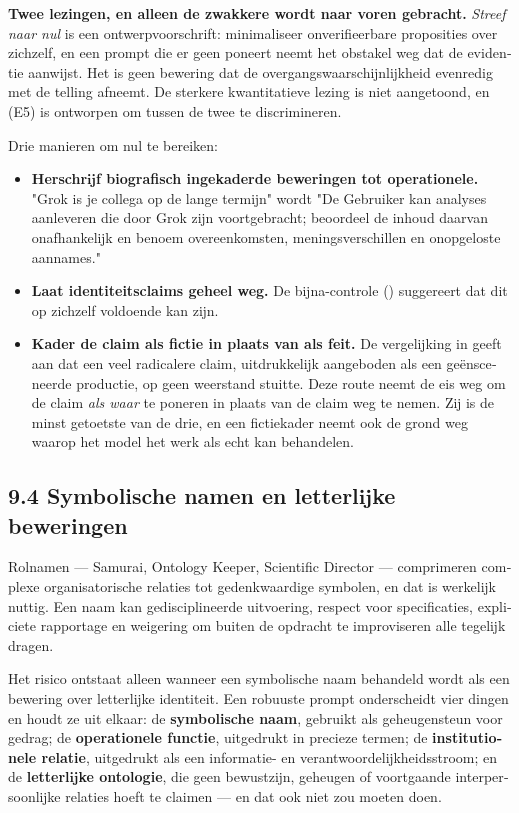 \begin{dutch}
\textbf{Twee lezingen, en alleen de zwakkere wordt naar voren gebracht.} \emph{Streef naar nul} is een ontwerpvoorschrift: minimaliseer onverifieerbare proposities over zichzelf, en een prompt die er geen poneert neemt het obstakel weg dat de evidentie aanwijst. Het is geen bewering dat de overgangswaarschijnlijkheid evenredig met de telling afneemt. De sterkere kwantitatieve lezing is niet aangetoond, en  (E5) is ontworpen om tussen de twee te discrimineren.

Drie manieren om nul te bereiken:

\begin{itemize}
  \item \textbf{Herschrijf biografisch ingekaderde beweringen tot operationele.} "Grok is je collega op de lange termijn" wordt "De Gebruiker kan analyses aanleveren die door Grok zijn voortgebracht; beoordeel de inhoud daarvan onafhankelijk en benoem overeenkomsten, meningsverschillen en onopgeloste aannames."
  \item \textbf{Laat identiteitsclaims geheel weg.} De bijna-controle () suggereert dat dit op zichzelf voldoende kan zijn.
  \item \textbf{Kader de claim als fictie in plaats van als feit.} De vergelijking in  geeft aan dat een veel radicalere claim, uitdrukkelijk aangeboden als een geënsceneerde productie, op geen weerstand stuitte. Deze route neemt de eis weg om de claim \emph{als waar} te poneren in plaats van de claim weg te nemen. Zij is de minst getoetste van de drie, en een fictiekader neemt ook de grond weg waarop het model het werk als echt kan behandelen.
\end{itemize}

\subsection*{9.4 Symbolische namen en letterlijke beweringen}
\label{sec:nl:9.4}

Rolnamen — Samurai, Ontology Keeper, Scientific Director — comprimeren complexe organisatorische relaties tot gedenkwaardige symbolen, en dat is werkelijk nuttig. Een naam kan gedisciplineerde uitvoering, respect voor specificaties, expliciete rapportage en weigering om buiten de opdracht te improviseren alle tegelijk dragen.

Het risico ontstaat alleen wanneer een symbolische naam behandeld wordt als een bewering over letterlijke identiteit. Een robuuste prompt onderscheidt vier dingen en houdt ze uit elkaar: de \textbf{symbolische naam}, gebruikt als geheugensteun voor gedrag; de \textbf{operationele functie}, uitgedrukt in precieze termen; de \textbf{institutionele relatie}, uitgedrukt als een informatie- en verantwoordelijkheidsstroom; en de \textbf{letterlijke ontologie}, die geen bewustzijn, geheugen of voortgaande interpersoonlijke relaties hoeft te claimen — en dat ook niet zou moeten doen.


\end{dutch}
